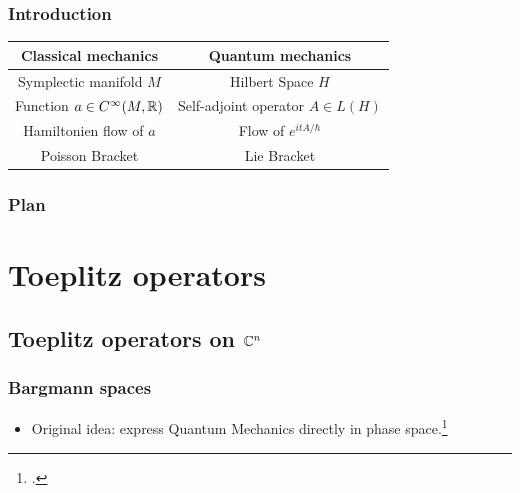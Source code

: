\documentclass[mathserif]{beamer}
\newcommand{\spline}{\hline}
\begin{document}
\begin{frame}\frametitle{Introduction}
\begin{center}
	\begin{tabular}{|c|c|}
		\spline
	    Classical mechanics & Quantum mechanics\\
		\spline
		Symplectic manifold $M$ & Hilbert Space $H$\\ 
		\spline 
		Function $a\in C^{\infty}(M,\mathbb{R})$ & Self-adjoint
                                                   operator $A\in L(H)$\\
		\spline
                Hamiltonien flow of $a$ & Flow of $e^{itA/\hbar}$\\
		\spline
		Poisson Bracket & Lie Bracket\\
		\spline
	\end{tabular}\end{center}\vspace{0em}
	\begin{itemize}
	\end{itemize}
\end{frame}

\AtBeginSection
{
	\begin{frame}
		\frametitle{Plan}
		\tableofcontents[currentsection]
	\end{frame}
	
}

\section{Toeplitz operators}
\subsection{Toeplitz operators on $\mathbb{C}^n$}
\begin{frame}
  \frametitle{Bargmann spaces}
  \begin{itemize}
  \item Original idea: express Quantum Mechanics directly in phase
    space.\footcite{bargmann_hilbert_1961}
  \vspace{-2em}
  \end{itemize}

\end{frame}
\end{document}
